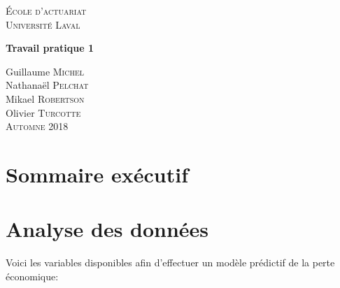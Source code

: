 \documentclass{article}\usepackage[]{graphicx}\usepackage[]{color}
\begin{document}
\thispagestyle{empty}
\begin{center}

\vspace{3cm}

\textsc{\Large École d'actuariat}\\
\textsc{\Large Université Laval}\\[0.5cm]

\vspace{5cm}

{ \LARGE \bfseries Travail pratique 1  \\ }

\vfill

\Large Guillaume \textsc{Michel}\\
\Large Nathanaël \textsc{Pelchat}\\
\Large Mikael \textsc{Robertson}\\
\Large Olivier \textsc{Turcotte}\\
\vspace{3cm}
{\Large \textsc{Automne} 2018}

\end{center}
\newpage




\section{Sommaire exécutif}
\label{sec:sommaire}


\newpage
\tableofcontents
\newpage

\section{Analyse des données} 
\label{sec:analyse}

Voici les variables disponibles afin d'effectuer un modèle prédictif de la perte économique:
\end{document}
